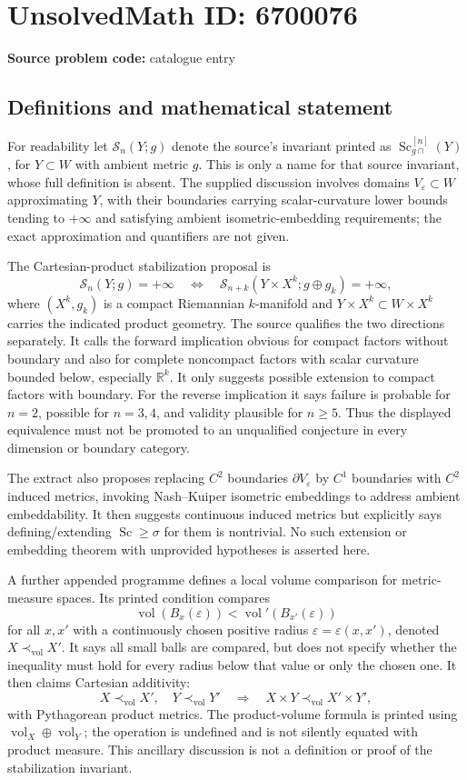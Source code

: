 \documentclass[11pt]{article}
\newcommand{\R}{\mathbb{R}}
\begin{document}
\section*{UnsolvedMath ID: 6700076}
\textbf{Source problem code:} catalogue entry
\subsection{Definitions and mathematical statement}
For readability let $\mathcal S_n(Y;g)$ denote the source's invariant printed as $\operatorname{Sc}^{[n]}_{g\cap}(Y)$, for $Y\subset W$ with ambient metric $g$. This is only a name for that source invariant, whose full definition is absent. The supplied discussion involves domains $V_\varepsilon\subset W$ approximating $Y$, with their boundaries carrying scalar-curvature lower bounds tending to $+\infty$ and satisfying ambient isometric-embedding requirements; the exact approximation and quantifiers are not given.

The Cartesian-product stabilization proposal is
\[
\mathcal S_n(Y;g)=+\infty\quad\Longleftrightarrow\quad
\mathcal S_{n+k}(Y\times X^k;g\oplus g_k)=+\infty,
\]
where $(X^k,g_k)$ is a compact Riemannian $k$-manifold and $Y\times X^k\subset W\times X^k$ carries the indicated product geometry. The source qualifies the two directions separately. It calls the forward implication obvious for compact factors without boundary and also for complete noncompact factors with scalar curvature bounded below, especially $\R^k$. It only suggests possible extension to compact factors with boundary. For the reverse implication it says failure is probable for $n=2$, possible for $n=3,4$, and validity plausible for $n\geq5$. Thus the displayed equivalence must not be promoted to an unqualified conjecture in every dimension or boundary category.

The extract also proposes replacing $C^2$ boundaries $\partial V_\varepsilon$ by $C^1$ boundaries with $C^2$ induced metrics, invoking Nash--Kuiper isometric embeddings to address ambient embeddability. It then suggests continuous induced metrics but explicitly says defining/extending $\operatorname{Sc}\geq\sigma$ for them is nontrivial. No such extension or embedding theorem with unprovided hypotheses is asserted here.

A further appended programme defines a local volume comparison for metric-measure spaces. Its printed condition compares
\[
\operatorname{vol}(B_x(\varepsilon))<\operatorname{vol}'(B_{x'}(\varepsilon))
\]
for all $x,x'$ with a continuously chosen positive radius $\varepsilon=\varepsilon(x,x')$, denoted $X\prec_{\mathrm{vol}}X'$. It says all small balls are compared, but does not specify whether the inequality must hold for every radius below that value or only the chosen one. It then claims Cartesian additivity:
\[
X\prec_{\mathrm{vol}}X',\quad Y\prec_{\mathrm{vol}}Y'
\quad\Longrightarrow\quad X\times Y\prec_{\mathrm{vol}}X'\times Y',
\]
with Pythagorean product metrics. The product-volume formula is printed using $\operatorname{vol}_X\oplus\operatorname{vol}_Y$; the operation is undefined and is not silently equated with product measure. This ancillary discussion is not a definition or proof of the stabilization invariant.
\end{document}
